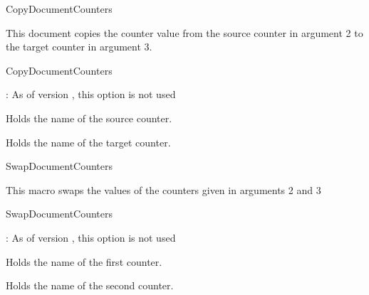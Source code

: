 \documentclass[12pt,a4paper,oneside]{article}
\def\packageversion{\xassoccntpackageversion}%
\begin{document}
\begin{docCommand}{CopyDocumentCounters}{}

This document copies the counter value from the source counter in argument 2 to the target counter in argument 3.

\begin{docCommandArgs}{CopyDocumentCounters}%


\begin{codeoptionsenum}
  \item {}: As of version \packageversion, this option is not used%

  \item {} 
    Holds the name of the source counter.
  \item {}
    Holds the name of the target counter.
  \end{codeoptionsenum}
\end{docCommandArgs}

\end{docCommand}%


\begin{docCommand}{SwapDocumentCounters}{}

This macro swaps the values of the counters given in arguments 2 and 3

\begin{docCommandArgs}{SwapDocumentCounters}%


\begin{codeoptionsenum}
  \item {}: As of version \packageversion, this option is not used%

  \item {} 
    Holds the name of the first counter.
  \item {}
    Holds the name of the second counter.
  \end{codeoptionsenum}
\end{docCommandArgs}

\end{docCommand}%
\end{document}
